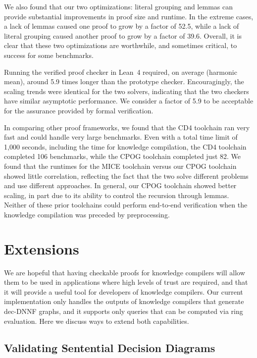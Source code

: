 \documentclass[twoside,11pt]{article}
\newcommand{\progname}[1]{\textsc{#1}}
\newcommand{\cdfour}{\progname{CD4}}
\newcommand{\lean}{Lean~4}
\begin{document}
We also found that our two optimizations: literal grouping and
lemmas can provide substantial improvements in proof size and runtime.
In the extreme cases, a lack
of lemmas caused one proof to grow by a factor of 52.5, while a lack
of literal grouping caused another proof to grow by a factor of 39.6.
Overall, it is clear that these two optimizations are worthwhile, and
sometimes critical, to success for some benchmarks.

Running the verified proof checker in \lean{} required, on average
(harmonic mean), around 5.9 times longer than the prototype checker.
Encouragingly, the scaling trends were identical for the two solvers,
indicating that the two checkers have similar asymptotic performance.
We consider a factor of 5.9 to be acceptable for the assurance
provided by formal verification.

In comparing other proof frameworks, we found that the \cdfour{}
toolchain ran very fast and could handle very large benchmarks.  Even
with a total time limit of 1,000 seconds, including the time for
knowledge compilation, the \cdfour{} toolchain completed 106
benchmarks, while the CPOG toolchain completed just 82.  We found
that the runtimes for the MICE toolchain versus our CPOG toolchain
showed little correlation, reflecting the fact that the two solve
different problems and use different approaches.  In general, our CPOG
toolchain showed better scaling, in part due to its ability to control
the recursion through lemmas.  Neither of these prior
toolchains could perform end-to-end verification when the knowledge
compilation was preceded by preprocessing.

\section{Extensions}

We are hopeful that having checkable proofs for knowledge compilers
will allow them to be used in applications where high levels of trust
are required, and that it will provide a useful tool for developers of
knowledge compilers.  Our current implementation only handles the
outputs of knowledge compilers that generate dec-DNNF graphs, and it
supports only queries that can be computed via ring evaluation.  Here
we discuss ways to extend both capabilities.


\subsection{Validating Sentential Decision Diagrams}
\label{sect:sdd}
\end{document}
